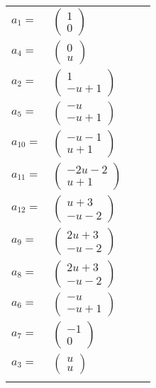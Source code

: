 \documentclass[1p]{elsarticle_modified}
\theoremstyle{definition}
\begin{document}
\begin{tabular}{m{7pt} m{180pt} m{7pt} m{180pt} }
\flushright $a_{1}=$&$\begin{pmatrix}1\\0\end{pmatrix}$ \\
\flushright $a_{4}=$&$\begin{pmatrix}0\\u\end{pmatrix}$ \\
\flushright $a_{2}=$&$\begin{pmatrix}1\\- u+1\end{pmatrix}$ \\
\flushright $a_{5}=$&$\begin{pmatrix}- u\\- u+1\end{pmatrix}$ \\
\flushright $a_{10}=$&$\begin{pmatrix}- u-1\\u+1\end{pmatrix}$ \\
\flushright $a_{11}=$&$\begin{pmatrix}-2 u-2\\u+1\end{pmatrix}$ \\
\flushright $a_{12}=$&$\begin{pmatrix}u+3\\- u-2\end{pmatrix}$ \\
\flushright $a_{9}=$&$\begin{pmatrix}2 u+3\\- u-2\end{pmatrix}$ \\
\flushright $a_{8}=$&$\begin{pmatrix}2 u+3\\- u-2\end{pmatrix}$ \\
\flushright $a_{6}=$&$\begin{pmatrix}- u\\- u+1\end{pmatrix}$ \\
\flushright $a_{7}=$&$\begin{pmatrix}-1\\0\end{pmatrix}$ \\
\flushright $a_{3}=$&$\begin{pmatrix}u\\u\end{pmatrix}$\\&\end{tabular}
\end{document}

